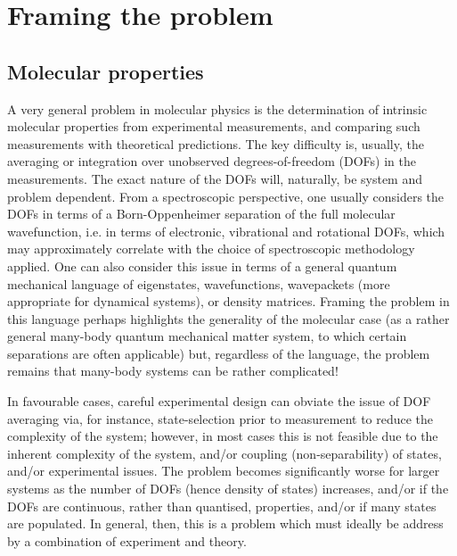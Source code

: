 \section{Framing the problem}

\subsection{Molecular properties}
A very general problem in molecular physics is the determination of intrinsic molecular properties from experimental measurements, and comparing such measurements with theoretical predictions. The key difficulty is, usually, the averaging or integration over unobserved degrees-of-freedom (DOFs) in the measurements. The exact nature of the DOFs will, naturally, be system and problem dependent. From a spectroscopic perspective, one usually considers the DOFs in terms of a Born-Oppenheimer separation of the full molecular wavefunction, i.e. in terms of electronic, vibrational and rotational DOFs, which may approximately correlate with the choice of spectroscopic methodology applied. One can also consider this issue in terms of a general quantum mechanical language of eigenstates, wavefunctions, wavepackets (more appropriate for dynamical systems), or density matrices. Framing the problem in this language perhaps highlights the generality of the molecular case (as a rather general many-body quantum mechanical matter system, to which certain separations are often applicable) but, regardless of the language, the problem remains that many-body systems can be rather complicated!

In favourable cases, careful experimental design can obviate the issue of DOF averaging via, for instance, state-selection prior to measurement to reduce the complexity of the system; however, in most cases this is not feasible due to the inherent complexity of the system, and/or coupling (non-separability) of states, and/or experimental issues. The problem becomes significantly worse for larger systems as the number of DOFs (hence density of states) increases, and/or if the DOFs are continuous, rather than quantised, properties, and/or if many states are populated. In general, then, this is a problem which must ideally be address by a combination of experiment and theory.